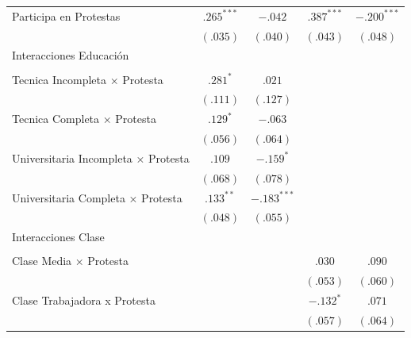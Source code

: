 \documentclass[
  13pt,
]{article}
\begin{document}
\begin{table}
{\begin{center}
{\begin{tabular}{l c c c c}
Participa en Protestas                    & $.265^{***}$  & $-.042$       & $.387^{***}$  & $-.200^{***}$ \\
                                          & $(.035)$      & $(.040)$      & $(.043)$      & $(.048)$      \\
Interacciones Educación                   &               &               &               &               \\
                                          &               &               &               &               \\
\quad Tecnica Incompleta × Protesta       & $.281^{*}$    & $.021$        &               &               \\
                                          & $(.111)$      & $(.127)$      &               &               \\
\quad Tecnica Completa × Protesta         & $.129^{*}$    & $-.063$       &               &               \\
                                          & $(.056)$      & $(.064)$      &               &               \\
\quad Universitaria Incompleta × Protesta & $.109$        & $-.159^{*}$   &               &               \\
                                          & $(.068)$      & $(.078)$      &               &               \\
\quad Universitaria Completa × Protesta   & $.133^{**}$   & $-.183^{***}$ &               &               \\
                                          & $(.048)$      & $(.055)$      &               &               \\
Interacciones Clase                       &               &               &               &               \\
                                          &               &               &               &               \\
\quad Clase Media × Protesta              &               &               & $.030$        & $.090$        \\
                                          &               &               & $(.053)$      & $(.060)$      \\
\quad Clase Trabajadora x Protesta        &               &               & $-.132^{*}$   & $.071$        \\
                                          &               &               & $(.057)$      & $(.064)$      \\

\end{tabular}}
\end{center}}
\end{table}
\end{document}
